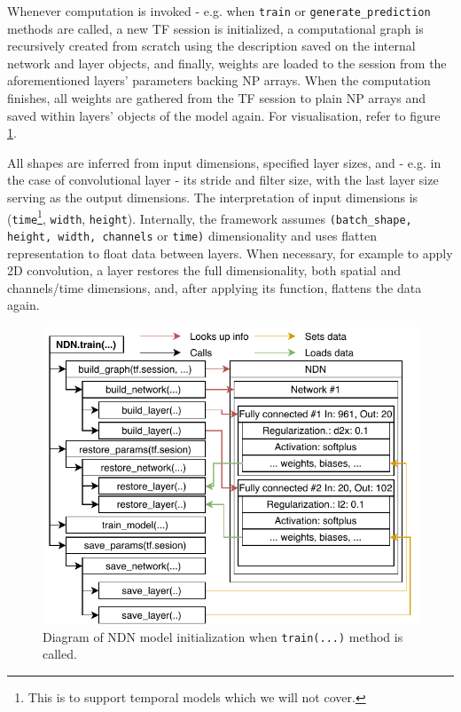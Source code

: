 Whenever computation is invoked - e.g. when \texttt{train} or \texttt{generate\_predic\-tion} methods are called, a new TF session is initialized, a computational graph is recursively created from scratch using the description saved on the internal network and layer objects, and finally, weights are loaded to the session from the aforementioned layers’ parameters backing NP arrays. When the computation finishes, all weights are gathered from the TF session to plain NP arrays and saved within layers’ objects of the model again. For visualisation, refer to figure \ref{fig:3.2}.

All shapes are inferred from input dimensions, specified layer sizes, and - e.g. in the case of convolutional layer - its stride and filter size, with the last layer size serving as the output dimensions. The interpretation of input dimensions is (\texttt{time}\footnote{This is to support temporal models which we will not cover.}, \texttt{width}, \texttt{height}). Internally, the framework assumes \texttt{(batch\_shape, height, width, channels} or \texttt{time)} dimensionality and uses flatten representation to float data between layers. When necessary, for example to apply 2D convolution, a layer restores the full dimensionality, both spatial and channels/time dimensions, and, after applying its function, flattens the data again. 

\begin{figure}[ht]
    \centering
    \includegraphics[]{../figures/03_NDN_2}
    \caption[NDN computation graph initialization]{Diagram of NDN model initialization when \texttt{train(...)} method is called.}
    \label{fig:3.2}
\end{figure}

